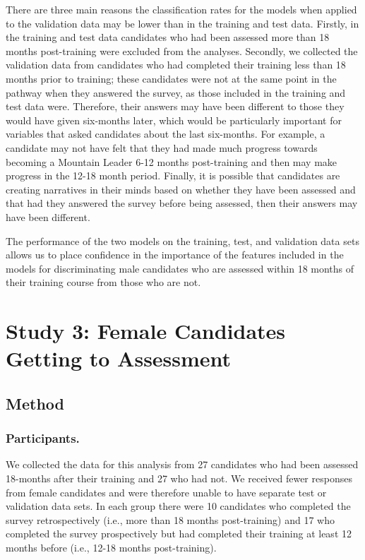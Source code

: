 \documentclass[
  12pt,
  a4paper,
]{book}
\begin{document}
There are three main reasons the classification rates for the models when applied to the validation data may be lower than in the training and test data. Firstly, in the training and test data candidates who had been assessed more than 18 months post-training were excluded from the analyses. Secondly, we collected the validation data from candidates who had completed their training less than 18 months prior to training; these candidates were not at the same point in the pathway when they answered the survey, as those included in the training and test data were. Therefore, their answers may have been different to those they would have given six-months later, which would be particularly important for variables that asked candidates about the last six-months. For example, a candidate may not have felt that they had made much progress towards becoming a Mountain Leader 6-12 months post-training and then may make progress in the 12-18 month period. Finally, it is possible that candidates are creating narratives in their minds based on whether they have been assessed and that had they answered the survey before being assessed, then their answers may have been different.

The performance of the two models on the training, test, and validation data sets allows us to place confidence in the importance of the features included in the models for discriminating male candidates who are assessed within 18 months of their training course from those who are not.

\hypertarget{female-gta}{%
\section{Study 3: Female Candidates Getting to Assessment}\label{female-gta}}

\hypertarget{female-gta-method}{%
\subsection{Method}\label{female-gta-method}}

\hypertarget{female-gta-participants}{%
\subsubsection{Participants.}\label{female-gta-participants}}

We collected the data for this analysis from 27 candidates who had been assessed 18-months after their training and 27 who had not. We received fewer responses from female candidates and were therefore unable to have separate test or validation data sets. In each group there were 10 candidates who completed the survey retrospectively (i.e., more than 18 months post-training) and 17 who completed the survey prospectively but had completed their training at least 12 months before (i.e., 12-18 months post-training).
\end{document}

